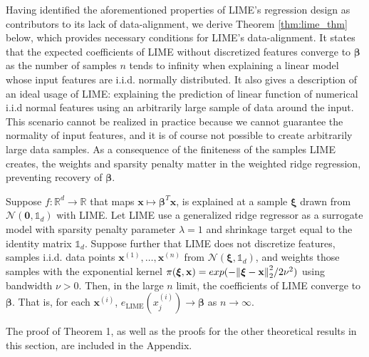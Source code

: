 \documentclass[mnsc,blindrev]{informs3}
\begin{document}
              Having identified the aforementioned properties of LIME's regression design as contributors to its lack of data-alignment, we derive Theorem \ref{thm:lime_thm} below, which provides necessary conditions for LIME's data-alignment. It states that the expected coefficients of LIME without discretized features converge to $\boldsymbol{\beta}$ as the number of samples $n$ tends to infinity when explaining a linear model whose input features are i.i.d. normally distributed. It also gives a description of an ideal usage of LIME: explaining the prediction of linear function of numerical i.i.d normal features using an arbitrarily large sample of data around the input. This scenario cannot be realized in practice because we cannot guarantee the normality of input features, and it is of course not possible to create arbitrarily large data samples. As a consequence of the finiteness of the samples LIME creates, the weights and sparsity penalty matter in the weighted ridge regression, preventing recovery of $\boldsymbol{\beta}$. 
            \begin{theorem}
                \label{thm:lime_thm}
                Suppose $f:\mathbb{R}^d\rightarrow \mathbb{R}$ that maps $\mathbf{x} \mapsto \boldsymbol{\beta}^T \mathbf{x}$, is explained at a sample $\boldsymbol{\xi}$ drawn from $\mathcal{N}(\mathbf{0}, \mathds{1}_d)$ with LIME. Let LIME use a generalized ridge regressor as a surrogate model with sparsity penalty parameter $\lambda=1$ and shrinkage target equal to the identity matrix $\mathds{1}_d$. Suppose further that LIME  does not discretize features, samples i.i.d. data points $\mathbf{x}^{(1)},\ldots,\mathbf{x}^{(n)}$ from $ \mathcal{N}(\boldsymbol{\xi}, \mathds{1}_d)$, and weights those samples with the exponential kernel $\pi(\boldsymbol{\xi},\mathbf{x}) = exp(-\norm{\boldsymbol{\xi}-\mathbf{x}}_2^2/2\nu^2)$ using bandwidth $\nu>0$. Then, in the large $n$ limit, the coefficients of LIME converge to $\boldsymbol{\beta}$. That is, for each $\mathbf{x}^{(i)}$, $e_{\text{LIME}}(x^{(i)}_j) \rightarrow \boldsymbol{\beta}$
                as $n \rightarrow \infty$.
            \end{theorem}
The proof of Theorem 1, as well as the proofs for the other theoretical results in this section, are included in the Appendix.
             
\end{document}
